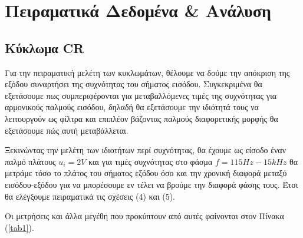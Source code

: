 \documentclass[a4paper]{article}
\begin{document}
\section*{Πειραματικά Δεδομένα \& Ανάλυση} 
	\subsection*{Κύκλωμα CR} 
		Για την πειραματική μελέτη των κυκλωμάτων, θέλουμε να δούμε την απόκριση της εξόδου συναρτήσει της συχνότητας του σήματος εισόδου. Συγκεκριμένα θα εξετάσουμε πως συμπεριφέρονται για μεταβαλλόμενες τιμές της συχνότητας για αρμονικούς παλμούς εισόδου, δηλαδή θα εξετάσουμε την ιδιότητά τους να λειτουργούν ως φίλτρα και επιπλέον βάζοντας παλμούς διαφορετικής μορφής θα εξετάσουμε πώς αυτή μεταβάλλεται.
		
		Ξεκινώντας την μελέτη των ιδιοτήτων περί συχνότητας, θα έχουμε ως είσοδο έναν παλμό πλάτους $u_i = 2V$ και για τιμές συχνότητας στο φάσμα $f=115Hz-15kHz$ θα μετράμε τόσο το πλάτος του σήματος εξόδου όσο και την χρονική διαφορά μεταξύ εισόδου-εξόδου για να μπορέσουμε εν τέλει να βρούμε την διαφορά φάσης τους. Έτσι θα ελέγξουμε πειραματικά τις σχέσεις (4) και (5). 
		
		Οι μετρήσεις και άλλα μεγέθη που προκύπτουν από αυτές φαίνονται στον Πίνακα (\ref{tab1}).
		
\end{document}
